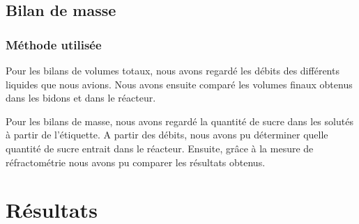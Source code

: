 \documentclass[a4paper,11pt, french]{article}
\begin{document}
	\subsection{Bilan de masse}
		\subsubsection{Méthode utilisée}
			Pour les bilans de volumes totaux, nous avons regardé les débits des différents liquides que nous avions. Nous avons ensuite comparé les volumes finaux obtenus dans les bidons et dans le réacteur.
			
			Pour les bilans de masse, nous avons regardé la quantité de sucre dans les solutés à partir de l'étiquette. A partir des débits, nous avons pu déterminer quelle quantité de sucre entrait dans le réacteur. Ensuite, grâce à la mesure de réfractométrie nous avons pu comparer les résultats obtenus.  

\section{Résultats}
\end{document}
